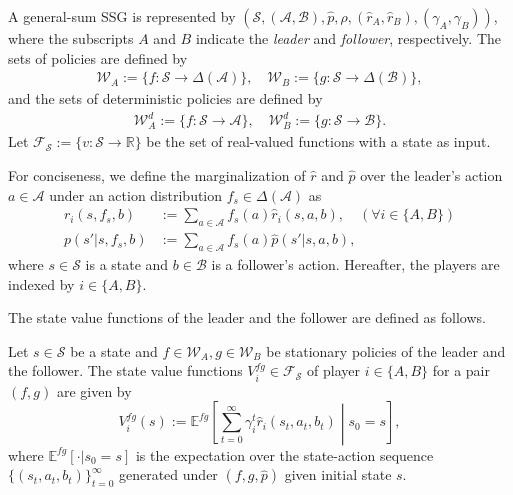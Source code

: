 \documentclass{acml}
\providecommand{\R}{\mathbb{R}} %
\providecommand{\E}{\mathbb{E}} %
\begin{document}
A general-sum SSG is represented by $(\mathcal{S}, (\mathcal{A},\mathcal{B}), \hat{p}, \rho, (\hat{r}_A,\hat{r}_B), (\gamma_A,\gamma_B))$, where the subscripts $A$ and $B$ indicate the \emph{leader} and \emph{follower}, respectively.
The sets of policies are defined by 
\begin{align*}
	\mathcal{W}_A:=\{f:\mathcal{S}\to\Delta(\mathcal{A})\},
        \quad 
	\mathcal{W}_B:=\{g:\mathcal{S}\to\Delta(\mathcal{B})\},
\end{align*}
and the sets of deterministic policies are defined by
\begin{align*}
	\mathcal{W}_A^d:=\{f:\mathcal{S}\to\mathcal{A}\},
	\quad
	\mathcal{W}_B^d:=\{g:\mathcal{S}\to\mathcal{B}\}.
\end{align*}
Let $\mathcal{F}_{\mathcal{S}}:=\{v:\mathcal{S}\to\R\}$ be the set of real-valued functions with a state as input.   

For conciseness, we define the marginalization of $\hat{r}$ and $\hat{p}$ over the leader's action $a\in\mathcal{A}$ under an action distribution $f_s\in\Delta(\mathcal{A})$ as
\begin{align*}
	r_i(s,f_s,b)&:=\sum_{a\in\mathcal{A}}f_s(a)\hat{r}_i(s,a,b),\quad(\forall i\in\{A,B\})\\
	p(s'|s,f_s,b)&:=\sum_{a\in\mathcal{A}}f_s(a)\hat{p}(s'|s,a,b),
\end{align*}
where $s\in\mathcal{S}$ is a state and $b\in\mathcal{B}$ is a follower's action.
Hereafter, the players are indexed by $i \in \{A, B\}$. 

The state value functions of the leader and the follower are defined as follows.
\begin{definition}
	Let $s\in\mathcal{S}$ be a state and $f\in\mathcal{W}_A,g\in\mathcal{W}_B$ be stationary policies of the leader and the follower.
	The state value functions $V_i^{fg}\in\mathcal{F}_{\mathcal{S}}$ of player $i\in\{A,B\}$ for a pair $(f, g)$ are given by
	\begin{equation*}
		V_i^{fg}(s):=\E^{fg}\left[\sum_{t=0}^{\infty}\gamma_i^t\hat{r}_i(s_t,a_t,b_t)\middle|s_0=s\right],
	\end{equation*}
	where $\E^{fg}\left[\cdot | s_0=s\right]$ is the expectation over the state-action sequence $\{(s_t,a_t,b_t)\}_{t=0}^{\infty}$ generated under $(f, g, \hat{p})$ given initial state $s$.
\end{definition}
\end{document}

